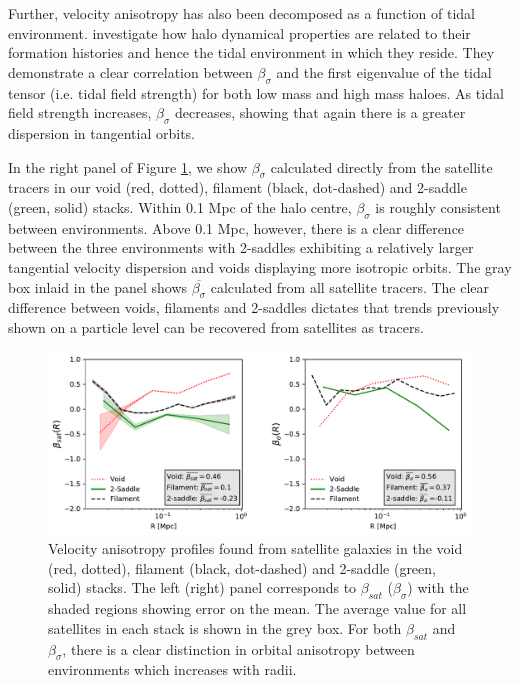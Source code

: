 Further, velocity anisotropy has also been decomposed as a function of tidal environment. \cite{shi2015} investigate how halo dynamical properties are related to their formation histories and hence the tidal environment in which they reside. They demonstrate a clear correlation between $\beta_{\sigma}$ and the first eigenvalue of the tidal tensor (i.e. tidal field strength) for both low mass and high mass haloes. As tidal field strength increases, $\beta_{\sigma}$ decreases, showing that again there is a greater dispersion in tangential orbits. 

In the right panel of Figure \ref{fig:beta_stack}, we show $\beta_{\sigma}$ calculated directly from the satellite tracers in our void (red, dotted), filament (black, dot-dashed) and 2-saddle (green, solid) stacks. Within 0.1 Mpc of the halo centre, $\beta_{\sigma}$ is roughly consistent between environments. Above 0.1 Mpc, however, there is a clear difference between the three environments with 2-saddles exhibiting a relatively larger tangential velocity dispersion and voids displaying more isotropic orbits. The gray box inlaid in the panel shows $\overline{\beta_{\sigma}}$ calculated from all satellite tracers. The clear difference between voids, filaments and 2-saddles dictates that trends previously shown on a particle level can be recovered from satellites as tracers. 

\begin{figure}
	\includegraphics[width=\linewidth]{thesis/latex/dyn_mod_files/disperse_beta_paper.pdf}
    \caption{Velocity anisotropy profiles found from satellite galaxies in the void (red, dotted), filament (black, dot-dashed) and 2-saddle (green, solid) stacks. The left (right) panel corresponds to $\beta_{sat}$ ($\beta_{\sigma}$) with the shaded regions showing error on the mean. The average value for all satellites in each stack is shown in the grey box. For both $\beta_{sat}$ and $\beta_{\sigma}$, there is a clear distinction in orbital anisotropy between environments which increases with radii.}
    \label{fig:beta_stack}
\end{figure}


